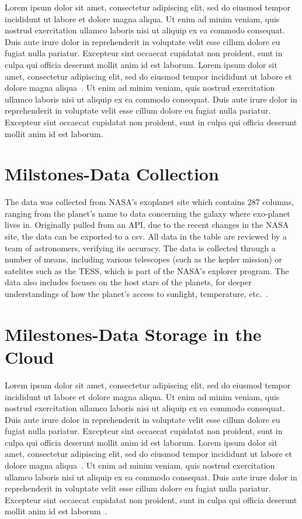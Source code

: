 \documentclass[letterpaper, 10 pt, conference]{ieeeconf}  %
\begin{document}
Lorem ipsum dolor sit amet, consectetur adipiscing elit, sed do eiusmod tempor incididunt ut labore et dolore magna aliqua. Ut enim ad minim veniam, quis nostrud exercitation ullamco laboris nisi ut aliquip ex ea commodo consequat. Duis aute irure dolor in reprehenderit in voluptate velit esse cillum dolore eu fugiat nulla pariatur. Excepteur sint occaecat cupidatat non proident, sunt in culpa qui officia deserunt mollit anim id est laborum. Lorem ipsum dolor sit amet, consectetur adipiscing elit, sed do eiusmod tempor incididunt ut labore et dolore magna aliqua~\cite{PopulationClock202007}. Ut enim ad minim veniam, quis nostrud exercitation ullamco laboris nisi ut aliquip ex ea commodo consequat. Duis aute irure dolor in reprehenderit in voluptate velit esse cillum dolore eu fugiat nulla pariatur. Excepteur sint occaecat cupidatat non proident, sunt in culpa qui officia deserunt mollit anim id est laborum.

\section{Milstones-Data Collection}

The data was collected from NASA's exoplanet site which contains 287 columns, ranging from the planet's name to data concerning the galaxy where exo-planet lives in. Originally pulled from an API, due to the recent changes in the NASA site, the data can be exported to a csv. All data in the table are reviewed by a team of astronomers, verifying its accuracy. The data is collected through a number of means, including various telescopes (such as the kepler mission) or satelites such as the TESS, which is part of the NASA's explorer program. The data also includes focuses on the host stars of the planets, for deeper understandings of how the planet's access to sunlight, temperature, etc.~\cite{nasaExoplanetArchive}. 

\section{Milestones-Data Storage in the Cloud}

Lorem ipsum dolor sit amet, consectetur adipiscing elit, sed do eiusmod tempor incididunt ut labore et dolore magna aliqua. Ut enim ad minim veniam, quis nostrud exercitation ullamco laboris nisi ut aliquip ex ea commodo consequat. Duis aute irure dolor in reprehenderit in voluptate velit esse cillum dolore eu fugiat nulla pariatur. Excepteur sint occaecat cupidatat non proident, sunt in culpa qui officia deserunt mollit anim id est laborum. Lorem ipsum dolor sit amet, consectetur adipiscing elit, sed do eiusmod tempor incididunt ut labore et dolore magna aliqua~\cite{Cite7}. Ut enim ad minim veniam, quis nostrud exercitation ullamco laboris nisi ut aliquip ex ea commodo consequat. Duis aute irure dolor in reprehenderit in voluptate velit esse cillum dolore eu fugiat nulla pariatur. Excepteur sint occaecat cupidatat non proident, sunt in culpa qui officia deserunt mollit anim id est laborum~\cite{Cite8}.
\end{document}
